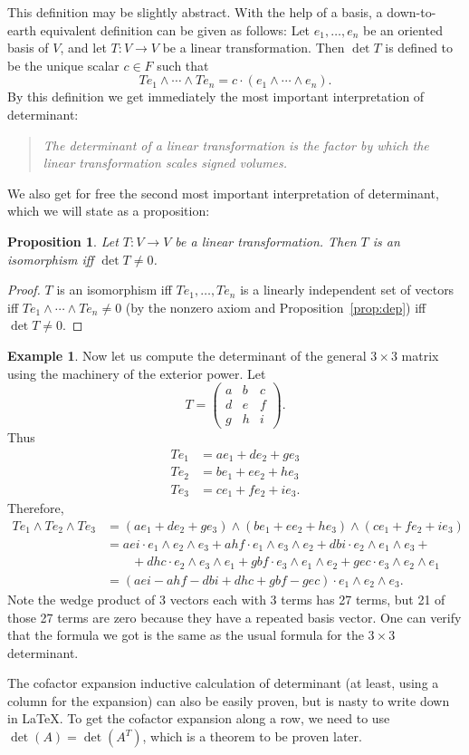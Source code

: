 \documentclass[11pt,oneside]{amsart}
\theoremstyle{definition}
\newtheorem{example}{Example}
\theoremstyle{plain}
\newtheorem{proposition}{Proposition}
\begin{document}
This definition may be slightly abstract. With the help of a basis, a down-to-earth equivalent definition can be given as follows: Let $e_1,\dots,e_n$ be an oriented basis of $V$, and let $T\colon V\to V$ be a linear transformation. Then $\det T$ is defined to be the unique scalar $c\in F$ such that
\[Te_1\wedge \cdots\wedge Te_n=c\cdot(e_1\wedge\cdots\wedge e_n).\]
By this definition we get immediately the most important interpretation of determinant:
\begin{quote}
    \emph{The determinant of a linear transformation is the factor by which the linear transformation scales signed volumes.}
\end{quote}
We also get for free the second most important interpretation of determinant, which we will state as a proposition:
\begin{proposition}
    Let $T\colon V\to V$ be a linear transformation. Then $T$ is an isomorphism iff $\det T\neq 0$.
\end{proposition}
\begin{proof}
    $T$ is an isomorphism iff $Te_1,\dots,Te_n$ is a linearly independent set of vectors iff $Te_1\wedge\cdots\wedge Te_n\neq 0$ (by the nonzero axiom and Proposition~\ref{prop:dep}) iff $\det T\neq 0$.
\end{proof}
\begin{example}
    Now let us compute the determinant of the general $3\times 3$ matrix using the machinery of the exterior power. Let
    \[T=\begin{pmatrix}
        a&b&c\\d&e&f\\g&h&i
    \end{pmatrix}.\]
    Thus
    \begin{align*}
        Te_1 &= ae_1+de_2+ge_3\\
        Te_2 &= be_1+ee_2+he_3\\
        Te_3 &= ce_1+fe_2+ie_3.
    \end{align*}
    Therefore,
    \[\begin{split}
        Te_1\wedge Te_2\wedge Te_3 &= (ae_1+de_2+ge_3)\wedge(be_1+ee_2+he_3)\wedge(ce_1+fe_2+ie_3)\\
        &= aei \cdot e_1\wedge e_2\wedge e_3 + ahf\cdot e_1\wedge e_3\wedge e_2+dbi\cdot e_2\wedge e_1\wedge e_3+\\
        &\qquad+dhc\cdot e_2\wedge e_3\wedge e_1+gbf\cdot e_3\wedge e_1\wedge e_2+gec\cdot e_3\wedge e_2\wedge e_1\\
        &= (aei-ahf-dbi+dhc+gbf-gec)\cdot e_1\wedge e_2\wedge e_3.
    \end{split}\]
    Note the wedge product of 3 vectors each with 3 terms has 27 terms, but 21 of those 27 terms are zero because they have a repeated basis vector. One can verify that the formula we got is the same as the usual formula for the $3\times 3$ determinant.
\end{example}
The cofactor expansion inductive calculation of determinant (at least, using a column for the expansion) can also be easily proven, but is nasty to write down in \LaTeX. To get the cofactor expansion along a row, we need to use $\det(A)=\det(A^T)$, which is a theorem to be proven later.
\end{document}
